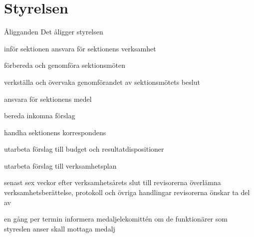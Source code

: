 \documentclass[pdfbookmarks,a4paper,11pt]{article}
\newlength{\itemcollength}
\newenvironment{reglemlista}{%
  \begin{list}{}{%
      \setlength{\labelwidth}{\itemcollength}%
      \setlength{\leftmargin}{\labelwidth + \labelsep}%
      \renewcommand{\makelabel}[1]{%
        \raisebox{0pt}[1ex][0pt]{%
          \makebox[\labelwidth][l]{%
            \parbox[t]{\itemcollength}{%
              \raggedright\hspace{0pt}##1}}}\hfill}%
      }}{%
  \end{list}}
\begin{document}
\section{Styrelsen}

\begin{reglemlista}

  \item[Åligganden]
    Det åligger styrelsen
    \begin{attlista}
      \item inför sektionen ansvara för sektionens verksamhet
      \item förbereda och genomföra sektionsmöten
      \item verkställa och övervaka genomförandet av sektionsmötets beslut
      \item ansvara för sektionens medel
      \item bereda inkomna förslag
      \item handha sektionens korrespondens
      \item utarbeta förslag till budget och resultatdispositioner
      \item utarbeta förslag till verksamhetsplan
      \item senast sex veckor efter verksamhetsårets slut till revisor\-erna överlämna verksamhetsberättelse, protokoll och övriga handlingar revisorerna önskar ta del av
      \item en gång per termin informera medaljelekomittén om de funktionärer som styreslen anser skall mottaga medalj


\end{attlista}
\end{reglemlista}
\end{document}
